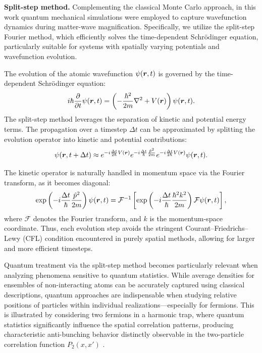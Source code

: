 \textbf{Split-step method.}
Complementing the classical Monte Carlo approach, in this work quantum mechanical simulations were employed to capture wavefunction dynamics during matter-wave magnification. Specifically, we utilize the split-step Fourier method, which efficiently solves the time-dependent Schrödinger equation, particularly suitable for systems with spatially varying potentials and wavefunction evolution.

The evolution of the atomic wavefunction $\psi(\boldsymbol{r}, t)$ is governed by the time-dependent Schrödinger equation:
\begin{equation*}
i\hbar\frac{\partial}{\partial t}\psi(\boldsymbol{r}, t) = \left(-\frac{\hbar^2}{2m}\nabla^2 + V(\boldsymbol{r})\right)\psi(\boldsymbol{r}, t).
\end{equation*}
The split-step method leverages the separation of kinetic and potential energy terms. The propagation over a timestep $\Delta t$ can be approximated by splitting the evolution operator into kinetic and potential contributions:
\begin{equation*}
\psi(\boldsymbol{r}, t + \Delta t) \approx e^{-i\frac{\Delta t}{2\hbar}V(\boldsymbol{r})} e^{-i\frac{\Delta t}{\hbar}\frac{\hat{p}^2}{2m}} e^{-i\frac{\Delta t}{2\hbar}V(\boldsymbol{r})}\psi(\boldsymbol{r}, t).
\end{equation*}

The kinetic operator is naturally handled in momentum space via the Fourier transform, as it becomes diagonal:
\begin{equation*}
\exp\left(-i\frac{\Delta t}{\hbar}\frac{\hat{p}^2}{2m}\right)\psi(\boldsymbol{r}, t) = \mathcal{F}^{-1}\left[\exp\left(-i\frac{\Delta t}{\hbar}\frac{\hbar^2 k^2}{2m}\right)\mathcal{F}{\psi(\boldsymbol{r}, t)}\right],
\end{equation*}
where $\mathcal{F}$ denotes the Fourier transform, and $k$ is the momentum-space coordinate. Thus, each evolution step avoids the stringent Courant–Friedrichs–Lewy (CFL) condition encountered in purely spatial methods, allowing for larger and more efficient timesteps.

Quantum treatment via the split-step method becomes particularly relevant when analyzing phenomena sensitive to quantum statistics. While average densities for ensembles of non-interacting atoms can be accurately captured using classical descriptions, quantum approaches are indispensable when studying relative positions of particles within individual realizations—especially for fermions. This is illustrated by considering two fermions in a harmonic trap, where quantum statistics significantly influence the spatial correlation patterns, producing characteristic anti-bunching behavior distinctly observable in the two-particle correlation function $P_2(x,x')$ \cite{bergschneider_experimental_2019}.

